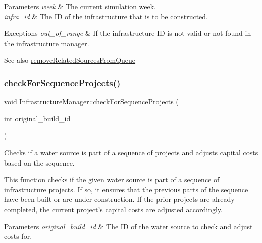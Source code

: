 \begin{DoxyParams}{Parameters}
{\em week} & The current simulation week. \\
\hline
{\em infra\+\_\+id} & The ID of the infrastructure that is to be constructed.\\
\hline
\end{DoxyParams}

\begin{DoxyExceptions}{Exceptions}
{\em out\+\_\+of\+\_\+range} & If the infrastructure ID is not valid or not found in the infrastructure manager.\\
\hline
\end{DoxyExceptions}
\begin{DoxySeeAlso}{See also}
\mbox{\hyperlink{classInfrastructureManager_abf6d8d9891abddfe08df0bb7677eee35}{remove\+Related\+Sources\+From\+Queue}} 
\end{DoxySeeAlso}
\mbox{\label{classInfrastructureManager_a4eca31074654eb197ba33342eee3bd32}} 
\subsubsection{\texorpdfstring{check\+For\+Sequence\+Projects()}{checkForSequenceProjects()}}
{\footnotesize\ttfamily void Infrastructure\+Manager\+::check\+For\+Sequence\+Projects (\begin{DoxyParamCaption}\item[{int}]{original\+\_\+build\+\_\+id }\end{DoxyParamCaption})}



Checks if a water source is part of a sequence of projects and adjusts capital costs based on the sequence. 

This function checks if the given water source is part of a sequence of infrastructure projects. If so, it ensures that the previous parts of the sequence have been built or are under construction. If the prior projects are already completed, the current project’s capital costs are adjusted accordingly.


\begin{DoxyParams}{Parameters}
{\em original\+\_\+build\+\_\+id} & The ID of the water source to check and adjust costs for.\\
\hline
\end{DoxyParams}

